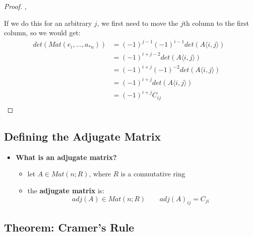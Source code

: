 \documentclass{exam}
\begin{document}
\begin{proof}
\sep 

If we do this for an arbitrary $j$, we first need to move the $j$th column to the first column, so we would get:
\begin{align*}
    det(Mat(e_i, \ldots, a_{*n})) &= (-1)^{j-1}(-1)^{i-1}det(A\langle i,j \rangle) \\
    &= (-1)^{i+j-2}det(A\langle i,j \rangle) \\
    &= (-1)^{i+j}(-1)^{-2}det(A\langle i,j \rangle) \\
    &= (-1)^{i+j}det(A\langle i,j \rangle) \\
    &= (-1)^{i+j}C_{ij} \\
\end{align*}

\end{proof}

\subsection{Defining the Adjugate Matrix}

\begin{itemize}
    \item \textbf{What is an adjugate matrix?}
    \begin{itemize}
        \item let $A \in Mat(n;R)$, where $R$ is a comuutative ring
        \item the \textbf{adjugate matrix} is:
        \[
        adj(A) \in Mat(n;R) \qquad adj(A)_{ij} = C_{ji}
        \]
    \end{itemize}
\end{itemize}

\subsection{Theorem: Cramer's Rule}

\end{document}
